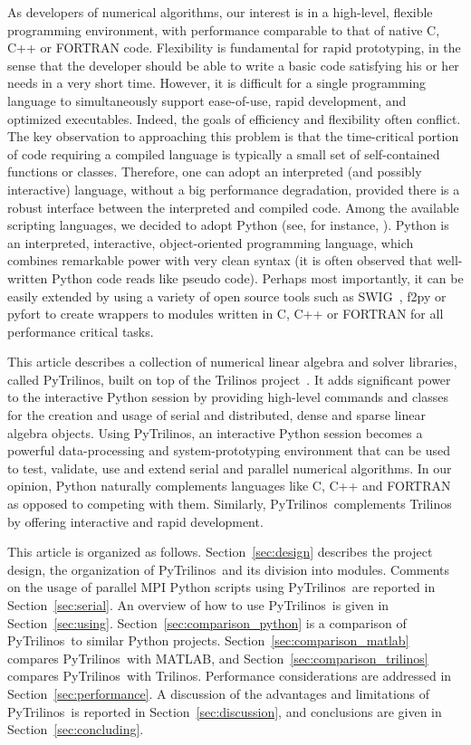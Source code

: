 \documentclass[acmtocl]{acmtrans2m}
\newcommand{\PyTrilinos}{{PyTrilinos}}
\begin{document}
As developers of numerical algorithms, our interest is in a
high-level, flexible programming environment, with performance
comparable to that of native C, C++ or FORTRAN code.  Flexibility is
fundamental for rapid prototyping, in the sense that the developer
should be able to write a basic code satisfying his or her needs in a
very short time.  However, it is difficult for a single programming
language to simultaneously support ease-of-use, rapid development, and
optimized executables.  Indeed, the goals of efficiency and
flexibility often conflict.  The key observation to approaching this
problem is that the time-critical portion of code requiring a compiled
language is typically a small set of self-contained functions or
classes.  Therefore, one can adopt an interpreted (and possibly
interactive) language, without a big performance degradation, provided
there is a robust interface between the interpreted and compiled code.
Among the available scripting languages, we decided to adopt Python
(see, for instance, \cite{python-book}).  Python is an interpreted,
interactive, object-oriented programming language, which combines
remarkable power with very clean syntax (it is often observed that
well-written Python code reads like pseudo code).  Perhaps most
importantly, it can be easily extended by using a variety of open
source tools such as SWIG~\cite{swig}, f2py or pyfort to create
wrappers to modules written in C, C++ or FORTRAN for all performance
critical tasks.

This article describes a collection of numerical linear algebra and
solver libraries, called \PyTrilinos, built on top of the Trilinos
project~\cite{Trilinos-home-page,Heroux:2005:OTP}.  It adds
significant power to the interactive Python session by providing
high-level commands and classes for the creation and usage of serial
and distributed, dense and sparse linear algebra objects.  Using
\PyTrilinos, an interactive Python session becomes a powerful
data-processing and system-prototyping environment that can be used to
test, validate, use and extend serial and parallel numerical
algorithms.  In our opinion, Python naturally complements languages
like C, C++ and FORTRAN as opposed to competing with them.  Similarly,
\PyTrilinos\ complements Trilinos by offering interactive and rapid
development.

\smallskip

This article is organized as follows.  Section~\ref{sec:design}
describes the project design, the organization of \PyTrilinos\ and its
division into modules.  Comments on the usage of parallel MPI Python
scripts using \PyTrilinos\ are reported in Section~\ref{sec:serial}.
An overview of how to use \PyTrilinos\ is given in
Section~\ref{sec:using}.  Section~\ref{sec:comparison_python} is a
comparison of \PyTrilinos\ to similar Python projects.
Section~\ref{sec:comparison_matlab} compares \PyTrilinos\ with MATLAB,
and Section~\ref{sec:comparison_trilinos} compares \PyTrilinos\ with
Trilinos.  Performance considerations are addressed in
Section~\ref{sec:performance}.  A discussion of the advantages and
limitations of \PyTrilinos\ is reported in Section~\ref{sec:discussion},
and conclusions are given in Section~\ref{sec:concluding}.
\end{document}
